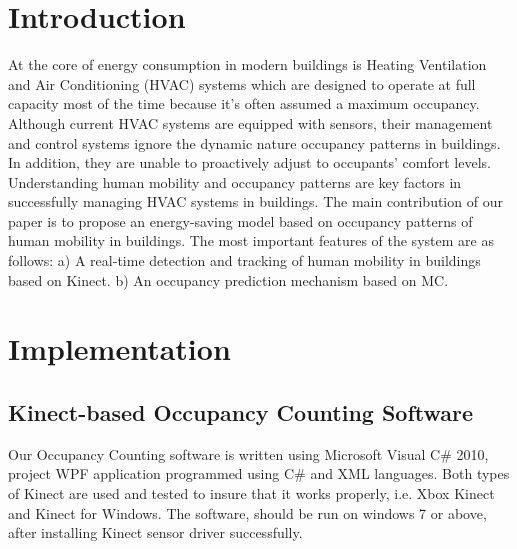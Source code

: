 \documentclass{sig-alternate}
\begin{document}
\section{Introduction}
\label{sec:introduction}
At the core of energy consumption in modern buildings is Heating Ventilation
and Air Conditioning (HVAC) systems which are designed to operate at
full capacity most of the time because it's often assumed a maximum
occupancy. Although current HVAC systems are equipped with sensors,
their management and control systems ignore the dynamic nature 
occupancy patterns in buildings. In addition, they are unable to
proactively adjust to occupants' comfort levels. Understanding human
mobility and occupancy patterns are key factors in successfully
managing HVAC systems in buildings. The main contribution of our paper
is to propose an energy-saving model based on occupancy patterns of
human mobility in buildings. The most important features of the system
are as follows: a) A real-time detection and tracking of human
mobility in buildings based on Kinect. b) An occupancy prediction
mechanism based on MC. 
\par






\section{Implementation}
\label{sec:implementation}

\subsection{Kinect-based Occupancy Counting Software}
Our Occupancy Counting software is written using Microsoft Visual
C\# 2010, project WPF application programmed using C\#
and XML languages. Both types of Kinect are used and tested to insure
that it works properly, i.e. Xbox Kinect and Kinect for Windows. The
software, should be run on windows 7 or above, after installing Kinect
sensor driver successfully.  
\end{document}
